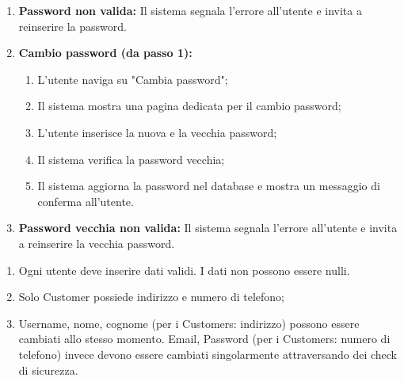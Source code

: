 \documentclass[border=10pt]{standalone}
\begin{document}
{\begin{enumerate}[nosep, leftmargin=25px]
            \item[\textbf{1c-e.}] \textbf{Password non valida:} Il sistema segnala l'errore all'utente e invita a reinserire la password.
            \item[\textbf{1d.}] \textbf{Cambio password (da passo 1):}
            \begin{enumerate}[nosep, leftmargin=1px]
                \item[i.] L'utente naviga su "Cambia password"; 
                \item[ii.] Il sistema mostra una pagina dedicata per il cambio password;
                \item[iii.] L'utente inserisce la nuova e la vecchia password;
                \item[iv.] Il sistema verifica la password vecchia;
                \item[v.] Il sistema aggiorna la password nel database e mostra un messaggio di conferma all'utente.
            \end{enumerate}
            \item[\textbf{1d-e.}] \textbf{Password vecchia non valida:} Il sistema segnala l'errore all'utente e invita a reinserire la vecchia password.
        \end{enumerate}
    }
    {
        \begin{enumerate}[nosep, leftmargin=*]
            \item[•] Ogni utente deve inserire dati validi. I dati non possono essere nulli.
            \item[•] Solo Customer possiede indirizzo e numero di telefono;
            \item[•] Username, nome, cognome (per i Customers: indirizzo) possono essere cambiati allo stesso momento. Email, Password (per i Customers: numero di telefono) invece devono essere cambiati singolarmente attraversando dei check di sicurezza.
        \end{enumerate}
    }
\end{document}
